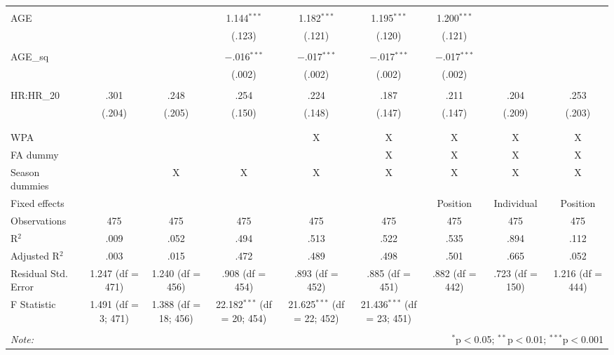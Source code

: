 \begin{table}[H]
\begin{tabular}{@{\extracolsep{5pt}}lcccccccc}
  & & & & & & & & \\
 AGE &  &  & 1.144$^{***}$ & 1.182$^{***}$ & 1.195$^{***}$ & 1.200$^{***}$ &  &  \\
  &  &  & (.123) & (.121) & (.120) & (.121) &  &  \\
  & & & & & & & & \\
 AGE\_sq &  &  & $-$.016$^{***}$ & $-$.017$^{***}$ & $-$.017$^{***}$ & $-$.017$^{***}$ &  &  \\
  &  &  & (.002) & (.002) & (.002) & (.002) &  &  \\
  & & & & & & & & \\
 HR:HR\_20 & .301 & .248 & .254 & .224 & .187 & .211 & .204 & .253 \\
  & (.204) & (.205) & (.150) & (.148) & (.147) & (.147) & (.209) & (.203) \\
  & & & & & & & & \\
\hline \\[-1.8ex]
WPA &  &  &  & X & X & X & X & X \\
FA dummy &  &  &  &  & X & X & X & X \\
Season dummies &  & X & X & X & X & X & X & X \\
Fixed effects &  &  &  &  &  & Position & Individual & Position \\
Observations & 475 & 475 & 475 & 475 & 475 & 475 & 475 & 475 \\
R$^{2}$ & .009 & .052 & .494 & .513 & .522 & .535 & .894 & .112 \\
Adjusted R$^{2}$ & .003 & .015 & .472 & .489 & .498 & .501 & .665 & .052 \\
Residual Std. Error & 1.247 (df = 471) & 1.240 (df = 456) & .908 (df = 454) & .893 (df = 452) & .885 (df = 451) & .882 (df = 442) & .723 (df = 150) & 1.216 (df = 444) \\
F Statistic & 1.491 (df = 3; 471) & 1.388 (df = 18; 456) & 22.182$^{***}$ (df = 20; 454) & 21.625$^{***}$ (df = 22; 452) & 21.436$^{***}$ (df = 23; 451) &  &  &  \\
\hline
\hline \\[-1.8ex]
\textit{Note:}  & \multicolumn{8}{r}{$^{*}$p$<$0.05; $^{**}$p$<$0.01; $^{***}$p$<$0.001} \\
\end{tabular}
\end{table}
